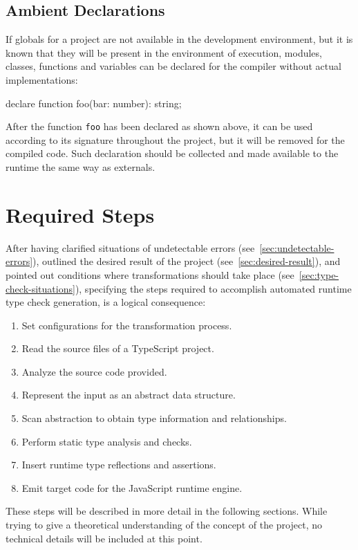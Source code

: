\subsection{Ambient Declarations}

If globals for a project are not available in the development environment, but it is known that they will be present in the environment of execution, modules, classes, functions and variables can be declared for the compiler without actual implementations:
\begin{JsCode}[numbers=none]
declare function foo(bar: number): string;
\end{JsCode}
After the function \texttt{foo} has been declared as shown above, it can be used according to its signature throughout the project, but it will be removed for the compiled code. Such declaration should be collected and made available to the runtime the same way as externals.

\section{Required Steps}
\label{sec:required-steps}

After having clarified situations of undetectable errors (see~\ref{sec:undetectable-errors}), outlined the desired result of the project (see~\ref{sec:desired-result}), and pointed out conditions where transformations should take place (see~\ref{sec:type-check-situations}), specifying the steps required to accomplish automated runtime type check generation, is a logical consequence:
\begin{enumerate}
  \item Set configurations for the transformation process.
  \item Read the source files of a TypeScript project.
  \item Analyze the source code provided.
  \item Represent the input as an abstract data structure.
  \item Scan abstraction to obtain type information and relationships.
  \item Perform static type analysis and checks.
  \item Insert runtime type reflections and assertions.
  \item Emit target code for the JavaScript runtime engine.
\end{enumerate}
These steps will be described in more detail in the following sections. While trying to give a theoretical understanding of the concept of the project, no technical details will be included at this point.

